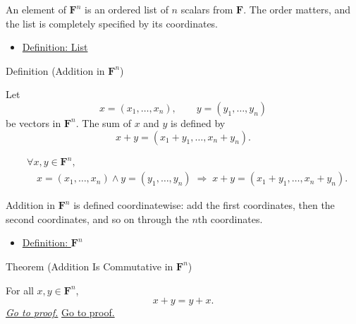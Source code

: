 \begin{remark*}[Interpretation]
An element of $\mathbf{F}^n$ is an ordered list of $n$ scalars from $\mathbf{F}$.
The order matters, and the list is completely specified by its coordinates.
\end{remark*}

\begin{remark*}[Dependencies]
\begin{itemize} 
  \item \hyperref[def:list]{Definition: List}
\end{itemize}
\end{remark*}


\begin{definitionbox}{Definition (Addition in $\mathbf{F}^n$)}
\begin{definition}
\label{def:addition-in-Fn}
Let
\[
x=(x_1,\dots,x_n), \qquad y=(y_1,\dots,y_n)
\]
be vectors in $\mathbf{F}^n$.
The sum of $x$ and $y$ is defined by
\[
x+y
=
(x_1+y_1,\dots,x_n+y_n).
\]
\end{definition}
\end{definitionbox}

\begin{remark*}
\[
\begin{aligned}
&\forall x,y \in \mathbf{F}^n, \\
&\quad
x=(x_1,\dots,x_n)\land y=(y_1,\dots,y_n)
\;\Rightarrow\;
x+y=(x_1+y_1,\dots,x_n+y_n).
\end{aligned}
\]
\end{remark*}

\begin{remark*}[Interpretation]
Addition in $\mathbf{F}^n$ is defined coordinatewise: add the first coordinates,
then the second coordinates, and so on through the $n$th coordinates.
\end{remark*}

\begin{remark*}[Dependencies]
\begin{itemize}
  \item \hyperref[def:Fn]{Definition: $\mathbf{F}^n$}
\end{itemize}
\end{remark*}


\begin{theorembox}{Theorem (Addition Is Commutative in $\mathbf{F}^n$)}
\begin{theorem}
\label{thm:addition-commutative-in-Fn}
For all $x,y \in \mathbf{F}^n$,
\[
x+y=y+x.
\]
\hyperref[prf:addition-commutative-fn]{\textit{Go to proof.}}
\hyperref[prf:addition-commutative-in-Fn]{Go to proof.}
\end{theorem}
\end{theorembox}

